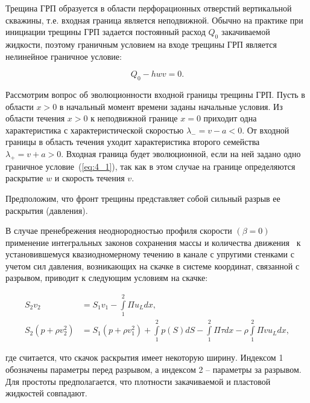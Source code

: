 Трещина ГРП образуется в области перфорационных отверстий вертикальной скважины, т.е. входная граница является неподвижной. Обычно на практике при инициации трещины ГРП задается постоянный расход $Q_0$ закачиваемой жидкости, поэтому граничным условием на входе трещины ГРП является нелинейное граничное условие:

\begin{equation}

Q_0 - hwv = 0.

\label{eq:4_1}

\end{equation}



Рассмотрим вопрос об эволюционности входной границы трещины ГРП. Пусть в области $x > 0$ в начальный момент времени заданы начальные условия. Из области течения $x > 0$ к неподвижной границе $x = 0$ приходит одна характеристика с характеристической скоростью $\lambda_- = v-a<0$. От входной границы в область течения уходит характеристика второго семейства $\lambda_+ = v+a>0$. Входная граница будет эволюционной, если на ней задано одно граничное условие~(\ref{eq:4_1}), так как в этом случае на границе определяются раскрытие $w$ и скорость течения $v$. 



Предположим, что фронт трещины представляет собой сильный разрыв ее раскрытия (давления). 

В случае пренебрежения неоднородностью профиля скорости $\left(\beta = 0\right)$ применение интегральных законов сохранения массы и количества движения~\cite{Chern1} к установившемуся квазиодномерному течению в канале с упругими стенками с учетом сил давления, возникающих на скачке в системе координат, связанной с разрывом, приводит к следующим условиям на скачке:     

\begin{align}

S_2 v_2 &= S_1 v_1 -\int\limits_{1}^{2} \Pi u_L dx, \nonumber \\

S_2 \left(p+\rho v_2^2\right) & = S_1 \left(p+\rho v_1^2\right) + \int\limits_{1}^{2} p(S) dS -\int\limits_{1}^{2}\Pi \tau dx - \rho \int\limits_{1}^{2}\Pi v u_L dx,\nonumber

\end{align}

где считается, что скачок раскрытия имеет некоторую ширину. Индексом 1 обозначены параметры перед разрывом, а индексом 2 – параметры за разрывом. Для простоты предполагается, что плотности закачиваемой и пластовой жидкостей совпадают.



